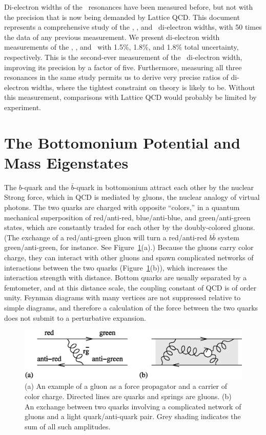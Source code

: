 \documentclass{cornell}
\begin{document}
Di-electron widths of the \ups\ resonances have been measured before,
but not with the precision that is now being demanded by Lattice QCD.
This document represents a comprehensive study of the \us, \uss, and
\usss\ di-electron widths, with 50 times the data of any previous
measurement.  We present di-electron width measurements of the \us,
\uss, and \usss\ with 1.5\%, 1.8\%, and 1.8\% total uncertainty,
respectively.  This is the second-ever measurement of the \usss\
di-electron width, improving its precision by a factor of five.
Furthermore, measuring all three resonances in the same study permits
us to derive very precise ratios of di-electron widths, where the
tightest constraint on theory is likely to be.  Without this
measurement, comparisons with Lattice QCD would probably be limited by
experiment.

\section{The Bottomonium Potential and Mass Eigenstates}

The $b$-quark and the $\bar{b}$-quark in bottomonium attract each
other by the nuclear Strong force, which in QCD is mediated by gluons,
the nuclear analogy of virtual photons.  The two quarks are charged
with opposite ``colors,'' in a quantum mechanical superposition of
red/anti-red, blue/anti-blue, and green/anti-green states, which are
constantly traded for each other by the doubly-colored gluons.  (The
exchange of a red/anti-green gluon will turn a red/anti-red $b\bar{b}$
system green/anti-green, for instance.  See Figure~\ref{gluejunk}(a).)
Because the gluons carry color charge, they can interact with other
gluons and spawn complicated networks of interactions between the two
quarks (Figure~\ref{gluejunk}(b)), which increases the interaction
strength with distance.  Bottom quarks are usually separated by a
femtometer, and at this distance scale, the coupling constant of QCD
is of order unity.  Feynman diagrams with many vertices are not
suppressed relative to simple diagrams, and therefore a calculation of
the force between the two quarks does not submit to a perturbative
expansion.

\begin{figure}[p]
  \begin{center}
    \includegraphics[width=\linewidth]{gluejunk}
  \end{center}
  \caption[Color exchange and the complexity of QCD]{\label{gluejunk} (a)
  An example of a gluon as a force propagator and a carrier of color
  charge.  Directed lines are quarks and springs are gluons.  (b) An
  exchange between two quarks involving a complicated network of
  gluons and a light quark/anti-quark pair.  Grey shading indicates
  the sum of all such amplitudes.}
\end{figure}
\end{document}
